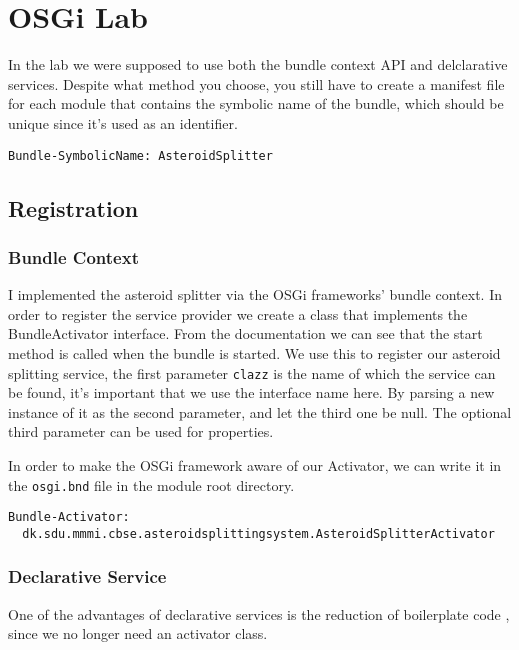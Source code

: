 \section{OSGi Lab}
% 

In the lab we were supposed to use both the bundle context API and delclarative
services. Despite what method you choose, you still have to create a manifest
file for each module that contains the symbolic name of the bundle, which should
be unique since it's used as an identifier.

\begin{verbatim}
Bundle-SymbolicName: AsteroidSplitter
\end{verbatim}

\subsection{Registration}
\subsubsection{Bundle Context}
I implemented the asteroid splitter via the OSGi frameworks' bundle context.
In order to register the service provider we create a class that implements the
BundleActivator interface. From the documentation
\cite{osgi-bundle-activator} we can see that the start method is called when the
bundle is started. We use this to register our asteroid splitting service, the
first parameter \texttt{clazz} is the name of which the service can be found,
it's important that we use the interface name here. By
parsing a new instance of it as the second parameter, and let the third one be
null. The optional third parameter can be used for properties.

In order to make the OSGi framework aware of our Activator, we can write it in
the \texttt{osgi.bnd} file in the module root directory.

\begin{verbatim}
Bundle-Activator: 
  dk.sdu.mmmi.cbse.asteroidsplittingsystem.AsteroidSplitterActivator
\end{verbatim}

\subsubsection{Declarative Service}
One of the advantages of declarative services is the reduction of boilerplate
code \cite{ibm-osgi-demystified}, since we no longer need an activator class.

